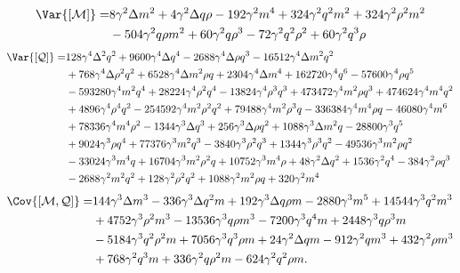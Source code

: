 \[\begin{split}
  \Var{[\mathcal{M}]} =& 8 \gamma ^2 \Delta  m^2+4 \gamma ^2 \Delta  q \rho-192 \gamma ^2 m^4+324 \gamma ^2 q^2 m^2+324 \gamma ^2 \rho^2 m^2 \\
                       & -504 \gamma ^2 q \rho m^2+60 \gamma ^2 q \rho^3-72 \gamma ^2 q^2 \rho^2+60 \gamma ^2 q^3 \rho 
\end{split}\]\[\begin{split}
  \Var{[\mathcal{Q}]} =& 128 \gamma ^4 \Delta ^2 q^2+9600 \gamma ^4 \Delta  q^4-2688 \gamma ^4 \Delta  \rho q^3-16512 \gamma ^4 \Delta  m^2 q^2 \\
                       &+768 \gamma ^4 \Delta  \rho^2 q^2+6528 \gamma ^4 \Delta  m^2 \rho q+2304 \gamma ^4 \Delta  m^4+162720 \gamma ^4 q^6-57600 \gamma ^4 \rho q^5 \\
                       &-593280 \gamma ^4 m^2 q^4+28224 \gamma ^4 \rho^2 q^4-13824 \gamma ^4 \rho^3 q^3+473472 \gamma ^4 m^2 \rho q^3+474624 \gamma ^4 m^4 q^2 \\
                       &+4896 \gamma ^4 \rho^4 q^2-254592 \gamma ^4 m^2 \rho^2 q^2+79488 \gamma ^4 m^2 \rho^3 q-336384 \gamma ^4 m^4 \rho q-46080 \gamma ^4 m^6 \\
                       &+78336 \gamma ^4 m^4 \rho^2-1344 \gamma ^3 \Delta  q^3+256 \gamma ^3 \Delta  \rho q^2+1088 \gamma ^3 \Delta  m^2 q-28800 \gamma ^3 q^5 \\
                       &+9024 \gamma ^3 \rho q^4+77376 \gamma ^3 m^2 q^3-3840 \gamma ^3 \rho^2 q^3+1344 \gamma ^3 \rho^3 q^2-49536 \gamma ^3 m^2 \rho q^2 \\
                       &-33024 \gamma ^3 m^4 q+16704 \gamma ^3 m^2 \rho^2 q+10752 \gamma ^3 m^4 \rho+48 \gamma ^2 \Delta  q^2+1536 \gamma ^2 q^4-384 \gamma ^2 \rho q^3 \\
                       &-2688 \gamma ^2 m^2 q^2+128 \gamma ^2 \rho^2 q^2+1088 \gamma ^2 m^2 \rho q+320 \gamma ^2 m^4 
\end{split}\]\[\begin{split}
  \Cov{[\mathcal{M},\mathcal{Q}]} =& 144 \gamma ^3 \Delta  m^3-336 \gamma ^3 \Delta  q^2 m+192 \gamma ^3 \Delta  q \rho m-2880 \gamma ^3 m^5+14544 \gamma ^3 q^2 m^3  \\
                                   &+4752 \gamma ^3 \rho^2 m^3-13536 \gamma ^3 q \rho m^3-7200 \gamma ^3 q^4 m+2448 \gamma ^3 q \rho^3 m \\
                                   &-5184 \gamma ^3 q^2 \rho^2 m+7056 \gamma ^3 q^3 \rho m +24 \gamma ^2 \Delta  q m-912 \gamma ^2 q m^3+432 \gamma ^2 \rho m^3 \\
                                   &+768 \gamma ^2 q^3 m+336 \gamma ^2 q \rho^2 m-624 \gamma ^2 q^2 \rho m.
\end{split}\]

